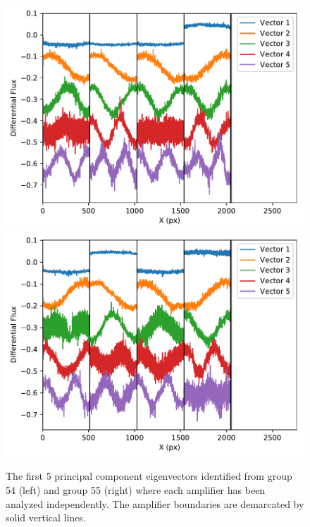 \documentclass{aastex62}
\begin{document}
\begin{figure}[!hbtp]
\centering
\includegraphics[width=.4\columnwidth]{pca_dark_ind_amp_grp_54_extra_bias_sub.pdf}
\includegraphics[width=.4\columnwidth]{pca_dark_ind_amp_grp_55_extra_bias_sub.pdf}
\caption{The first 5 principal component eigenvectors identified from group 54 (left) and group 55 (right) where each amplifier has been analyzed independently.
The amplifier boundaries are demarcated by solid vertical lines.
}\label{fig:pcaEigenvectorsIndAmp}
\end{figure}
\end{document}
